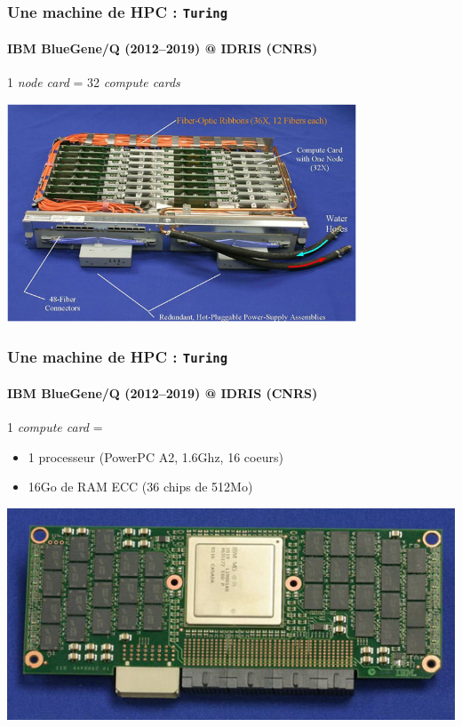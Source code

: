 \documentclass[xcolor={x11names,svgnames}]{beamer}
\begin{document}
\begin{frame}
  \frametitle{Une machine de HPC : \texttt{Turing}}
  \framesubtitle{IBM BlueGene/Q (2012--2019) @ IDRIS (CNRS)}
  
  1 \textit{node card} = 32 \textit{compute cards}
  
  \begin{center}
    \includegraphics[height=6.5cm]{bgqNodeCard}
  \end{center}
\end{frame}


\begin{frame}
  \frametitle{Une machine de HPC : \texttt{Turing}}
  \framesubtitle{IBM BlueGene/Q (2012--2019) @ IDRIS (CNRS)}
  
  1 \textit{compute card} =
  \begin{itemize}
  \item 1 processeur (PowerPC A2, 1.6Ghz, 16 coeurs)
  \item 16Go de RAM ECC (36 chips de 512Mo)
  \end{itemize}

  \begin{center}
    \includegraphics[width=\textwidth]{bgqComputeCard}
  \end{center}
\end{frame}
\end{document}
